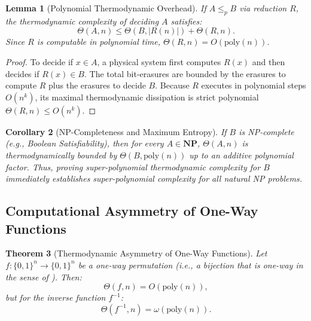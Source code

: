 \documentclass[12pt, a4paper]{article}
\newcommand{\NPc}{\mathbf{NP}}
\newcommand{\poly}{\text{poly}}
\theoremstyle{plain}
\newtheorem{theorem}{Theorem}[section]
\newtheorem{lemma}[theorem]{Lemma}
\newtheorem{corollary}[theorem]{Corollary}
\theoremstyle{definition}
\theoremstyle{remark}
\begin{document}
\begin{lemma}[Polynomial Thermodynamic Overhead]\label{lem:karp_overhead}
  If $A \leq_p B$ via reduction $R$, the thermodynamic complexity of deciding $A$ satisfies:
  \begin{equation}
    \Theta(A, n) \leq \Theta(B, |R(n)|) + \Theta(R, n).
  \end{equation}
  Since $R$ is computable in polynomial time, $\Theta(R, n) = O(\poly(n))$.
\end{lemma}

\begin{proof}
  To decide if $x \in A$, a physical system first computes $R(x)$ and then decides if $R(x) \in B$. The total bit-erasures are bounded by the erasures to compute $R$ plus the erasures to decide $B$. Because $R$ executes in polynomial steps $O(n^k)$, its maximal thermodynamic dissipation is strict polynomial $\Theta(R, n) \le O(n^k)$.
\end{proof}

\begin{corollary}[NP-Completeness and Maximum Entropy]\label{cor:np_complete_entropy}
  If $B$ is NP-complete (e.g., Boolean Satisfiability), then for every $A \in \NPc$, $\Theta(A, n)$ is thermodynamically bounded by $\Theta(B, \poly(n))$ up to an additive polynomial factor. Thus, proving super-polynomial thermodynamic complexity for $B$ immediately establishes super-polynomial complexity for all natural NP problems.
\end{corollary}

\subsection{Computational Asymmetry of One-Way Functions}

\begin{theorem}[Thermodynamic Asymmetry of One-Way Functions]\label{thm:asymmetry}
  Let $f: \{0,1\}^n \to \{0,1\}^n$ be a one-way permutation (i.e., a
  bijection that is one-way in the sense of ). Then:
  \begin{equation}\label{eq:asymmetry}
    \Theta(f, n) = O(\poly(n)),
  \end{equation}
  but for the inverse function $f^{-1}$:
  \begin{equation}\label{eq:inverse_cost}
    \Theta(f^{-1}, n) = \omega(\poly(n)).
  \end{equation}
\end{theorem}
\end{document}
